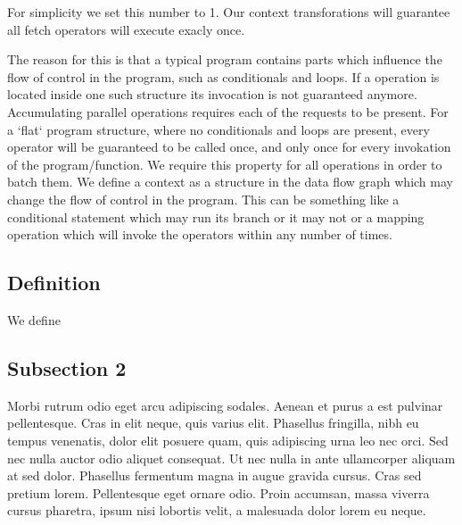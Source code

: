For simplicity we set this number to 1.
Our context transforations will guarantee all fetch operators will execute exacly once.


The reason for this is that a typical program contains parts which influence the flow of control in the program, such as conditionals and loops.
If a \fetch{} operation is located inside one such structure its invocation is not guaranteed anymore.
Accumulating parallel \fetch{} operations requires each of the requests to be present.
For a `flat` program structure, where no conditionals and loops are present, every operator will be guaranteed to be called once, and only once for every invokation of the program/function.
We require this property for all \fetch{} operations in order to batch them.
We define a context as a structure in the data flow graph which may change the flow of control in the program.
This can be something like a conditional statement which may run its branch or it may not or a mapping operation which will invoke the operators within any number of times.


\subsection{Definition}

We define


\subsection{Subsection 2}
Morbi rutrum odio eget arcu adipiscing sodales. Aenean et purus a est pulvinar pellentesque. Cras in elit neque, quis varius elit. Phasellus fringilla, nibh eu tempus venenatis, dolor elit posuere quam, quis adipiscing urna leo nec orci. Sed nec nulla auctor odio aliquet consequat. Ut nec nulla in ante ullamcorper aliquam at sed dolor. Phasellus fermentum magna in augue gravida cursus. Cras sed pretium lorem. Pellentesque eget ornare odio. Proin accumsan, massa viverra cursus pharetra, ipsum nisi lobortis velit, a malesuada dolor lorem eu neque.


